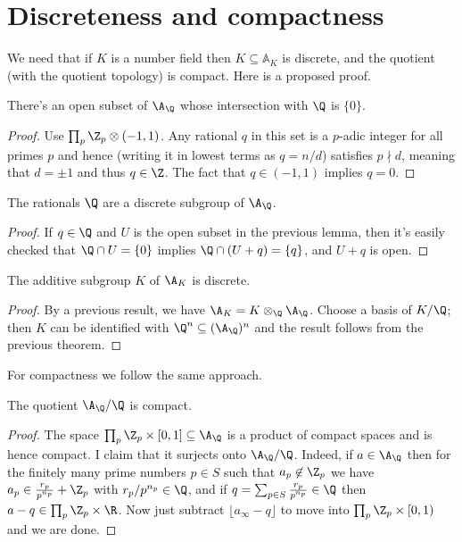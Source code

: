 \section{Discreteness and compactness}

We need that if $K$ is a number field then
$K\subseteq\mathbb{A}_K$ is discrete, and the quotient (with the
quotient topology) is compact. Here is a proposed proof.

\begin{theorem}
  \label{Rat.AdeleRing.zero_discrete}
  \leanok
  There's an open subset of $\A_{\Q}$ whose intersection with $\Q$ is $\{0\}$.
\end{theorem}
\begin{proof}
  Use $\prod_p{\Z_p}\otimes(-1,1)$. Any rational $q$ in this set is a $p$-adic
  integer for all primes $p$ and hence (writing it in lowest terms as $q=n/d$)
  satisfies $p\nmid d$, meaning that $d=\pm1$ and thus $q\in\Z$. The fact
  that $q\in(-1,1)$ implies $q=0$.
\end{proof}

\begin{theorem}
  \label{Rat.AdeleRing.discrete}
  \leanok
  The rationals $\Q$ are a discrete subgroup of $\A_{\Q}$.
\end{theorem}
\begin{proof}
  If $q\in\Q$ and $U$ is the open subset in the previous lemma, then
  it's easily checked that $\Q\cap U=\{0\}$ implies $\Q\cap (U+q)=\{q\}$,
  and $U+q$ is open.
\end{proof}

\begin{theorem}
  \label{NumberField.AdeleRing.discrete}
  \leanok
  The additive subgroup $K$ of $\A_K$ is discrete.
\end{theorem}
\begin{proof}
  By a previous result, we have $\A_K=K\otimes_{\Q}\A_{\Q}$.
  Choose a basis of $K/\Q$; then $K$ can be identified with $\Q^n\subseteq(\A_{\Q})^n$
  and the result follows from the previous theorem.
\end{proof}

For compactness we follow the same approach.

\begin{theorem}
  \label{Rat.AdeleRing.cocompact}
  \leanok
  The quotient $\A_{\Q}/\Q$ is compact.
\end{theorem}
\begin{proof}
  The space $\prod_p\Z_p\times[0,1]\subseteq\A_{\Q}$ is a product of compact spaces
  and is hence compact. I claim that it surjects onto $\A_{\Q}/\Q$. Indeed,
  if $a\in\A_{\Q}$ then for the finitely many prime numbers $p\in S$ such that $a_p\not\in\Z_p$
  we have $a_p\in\frac{r_p}{p^{n_p}}+\Z_p$ with $r_p/p^{n_p}\in\Q$, and
  if $q=\sum_{p\in S}\frac{r_p}{p^{n_p}}\in\Q$ then $a-q\in \prod_p\Z_p\times\R$.
  Now just subtract $\lfloor a_{\infty}-q\rfloor$ to move into $\prod_p\Z_p\times[0,1)$
  and we are done.
\end{proof}

